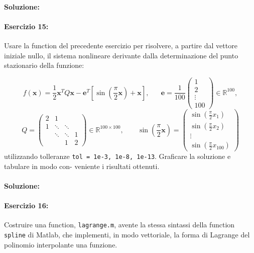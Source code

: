 \documentclass[12pt]{article}
\begin{document}
\paragraph{Soluzione:}

\paragraph{Esercizio 15:} Usare la function del precedente esercizio per risolvere, a partire dal vettore iniziale nullo, 
il sistema nonlineare derivante dalla determinazione del punto stazionario della funzione:

\begin{equation*} 
    f(\boldsymbol{x})=\frac{1}{2}\boldsymbol{x}^TQ\boldsymbol{x}-\boldsymbol{e}^T\left[ \sin(\frac{\pi}{2}\boldsymbol{x})+\boldsymbol{x}\right],\;\;\;\;\;\;
    \boldsymbol{e}=\frac{1}{100}
    \begin{pmatrix}
        1\\
        2\\
        \vdots \\
        100
    \end{pmatrix}
    \in \mathbb{R}^{100},
\end{equation*}
\begin{equation*}
    Q=
    \begin{pmatrix}
        2 & 1 &  & \\
        1 & \ddots &\ddots& \\
        &\ddots &\ddots &1 \\
        & &  1&2
    \end{pmatrix}
    \in \mathbb{R}^{100\times 100}, \;\;\;\;\;\;\;\sin(\frac{\pi}{2}\boldsymbol{x}) =
    \begin{pmatrix}
        \sin(\frac{\pi}{2}x_1)\\
        \sin(\frac{\pi}{2}x_2)\\
        \vdots \\
        \sin(\frac{\pi}{2}x_{100})
    \end{pmatrix}
\end{equation*}
utilizzando tolleranze \texttt{tol = 1e-3, 1e-8, 1e-13}. Graficare la soluzione e tabulare in modo con- veniente i risultati ottenuti.
\paragraph{Soluzione:}



\paragraph{Esercizio 16:}
Costruire una function, \texttt{lagrange.m}, avente la stessa sintassi della function \texttt{spline}
di Matlab, che implementi, in modo vettoriale, la forma di Lagrange del polinomio interpolante una
funzione.
\end{document}
